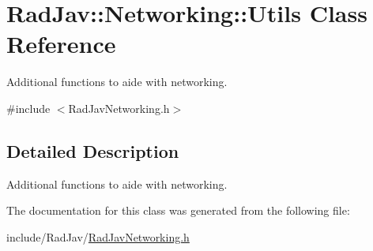\hypertarget{class_rad_jav_1_1_networking_1_1_utils}{}\section{Rad\+Jav\+:\+:Networking\+:\+:Utils Class Reference}
\label{class_rad_jav_1_1_networking_1_1_utils}


Additional functions to aide with networking.  




{\ttfamily \#include $<$Rad\+Jav\+Networking.\+h$>$}



\subsection{Detailed Description}
Additional functions to aide with networking. 

The documentation for this class was generated from the following file\+:\begin{DoxyCompactItemize}
\item 
include/\+Rad\+Jav/\hyperlink{_rad_jav_networking_8h}{Rad\+Jav\+Networking.\+h}\end{DoxyCompactItemize}
